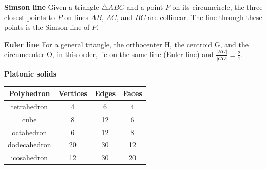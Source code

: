 \textbf{Simson line}
Given a triangle $\triangle ABC$ and a point $P$ on its circumcircle,
the three closest points to $P$ on lines $AB$, $AC$, and $BC$ are collinear.
The line through these points is the Simson line of $P$.

\textbf{Euler line}
For a general triangle, the orthocenter H, the centroid G, 
and the circumcenter O, in this order, lie on the same line (Euler line) 
and $\frac{|HG|}{|GO|} = \frac{2}{1}$.



\textbf{Platonic solids}
\begin{tabular}{ |c|c|c|c| } 
\hline
Polyhedron & Vertices & Edges & Faces \\ 
\hline
tetrahedron & 4 & 6 & 4 \\ 
\hline
cube & 8 & 12 & 6 \\ 
\hline
octahedron & 6 & 12 & 8 \\
\hline
dodecahedron & 20 & 30 & 12 \\
\hline
icosahedron & 12 & 30 & 20 \\
\hline
\end{tabular}
 
